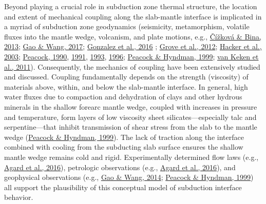 \documentclass[draft,linenumbers]{agujournal2018}
\providecommand{\DIFaddtex}[1]{{\protect\color{blue} \sf #1}} %
\providecommand{\DIFaddbegin}{} %
\providecommand{\DIFaddend}{} %
\providecommand{\DIFadd}[1]{\texorpdfstring{\DIFaddtex{#1}}{#1}} %
\begin{document}
Beyond playing a crucial role in subduction zone thermal structure, the
location and extent of mechanical coupling along the slab-mantle
interface is implicated in a myriad of subduction zone geodynamics
(seismicity, metamorphism, volatile fluxes into the mantle wedge,
volcanism, and plate motions, e.g.,
\protect\hyperlink{ref-Cizkova2013}{Čížková \& Bina, 2013};
\protect\hyperlink{ref-Gao2017}{Gao \& Wang, 2017};
\protect\DIFaddbegin \hyperlink{ref-Gonzalez2016}{Gonzalez et al., 2016}\DIFadd{;
}\protect\DIFaddend \hyperlink{ref-Grove2012}{Grove et al., 2012};
\protect\hyperlink{ref-Hacker2003}{Hacker et al., 2003};
\protect\hyperlink{ref-Peacock1990}{Peacock, 1990},
\protect\hyperlink{ref-Peacock1991}{1991},
\protect\hyperlink{ref-Peacock1993}{1993},
\protect\hyperlink{ref-Peacock1996}{1996};
\protect\hyperlink{ref-Peacock1999a}{Peacock \& Hyndman, 1999};
\protect\hyperlink{ref-VanKeken2011}{van Keken et al., 2011}).
Consequently, the mechanics of coupling have been extensively studied
and discussed. Coupling fundamentally depends on the strength
(viscosity) of materials above, within, and below the slab-mantle
interface. In general, high water fluxes due to compaction and
dehydration of clays and other hydrous minerals in the shallow forearc
mantle wedge, coupled with increases in pressure and temperature, form
layers of low viscosity sheet silicates---especially talc and
serpentine---that inhibit transmission of shear stress from the slab to
the mantle wedge (\protect\hyperlink{ref-Peacock1999a}{Peacock \&
Hyndman, 1999}). The lack of traction along the interface combined with
cooling from the subducting slab surface ensures the shallow mantle
wedge remains cold and rigid. Experimentally determined flow laws (e.g.,
\protect\hyperlink{ref-Agard2016}{Agard et al., 2016}), petrologic
observations (e.g., \protect\hyperlink{ref-Agard2016}{Agard et al.,
2016}), and geophysical observations (e.g.,
\protect\hyperlink{ref-Gao2014}{Gao \& Wang, 2014};
\protect\hyperlink{ref-Peacock1999a}{Peacock \& Hyndman, 1999}) all
support the plausibility of this conceptual model of subduction
interface behavior.
\end{document}
